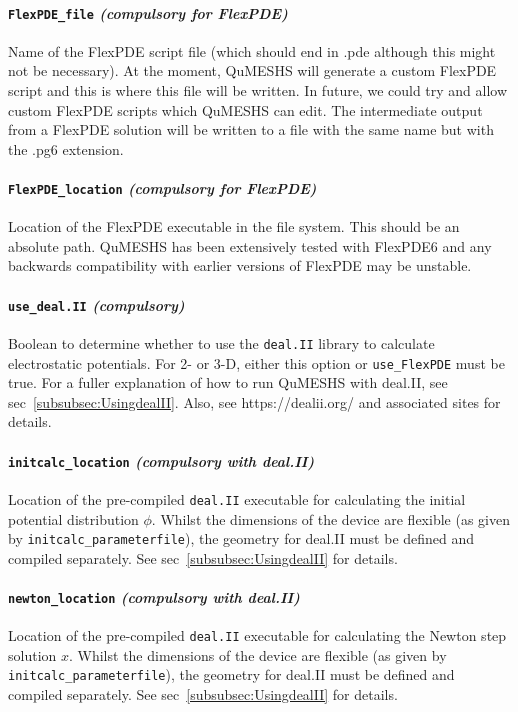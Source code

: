 \documentclass[12pt]{article}
\begin{document}
\paragraph{\texttt{FlexPDE\_file} \emph{(compulsory for FlexPDE)}}
Name of the FlexPDE script file (which should end in .pde although this might
not be necessary).  At the moment, QuMESHS will generate a custom FlexPDE
script and this is where this file will be written.  In future, we could try
and allow custom FlexPDE scripts which QuMESHS can edit.  The intermediate
output from a FlexPDE solution will be written to a file with the same name but
with the .pg6 extension.

\paragraph{\texttt{FlexPDE\_location} \emph{(compulsory for FlexPDE)}}
Location of the FlexPDE executable in the file system.  This should be an absolute
path.  QuMESHS has been extensively tested with FlexPDE6 and any backwards
compatibility with earlier versions of FlexPDE may be unstable.

\paragraph{\texttt{use\_deal.II} \emph{(compulsory)}}
Boolean to determine whether to use the \texttt{deal.II} library to calculate
electrostatic potentials.  For 2- or 3-D, either this option or
\texttt{use\_FlexPDE} must be true.  For a fuller explanation of how to
run QuMESHS with deal.II, see sec~\ref{subsubsec:UsingdealII}.  Also,
see https://dealii.org/ and associated sites for details.

\paragraph{\texttt{initcalc\_location} \emph{(compulsory with deal.II)}}
Location of the pre-compiled \texttt{deal.II} executable for calculating the initial
potential distribution $\phi$.  Whilst the dimensions of the device are flexible
(as given by \texttt{initcalc\_parameterfile}), the geometry for deal.II
must be defined and compiled separately.  See sec~\ref{subsubsec:UsingdealII}
for details.

\paragraph{\texttt{newton\_location} \emph{(compulsory with deal.II)}}
Location of the pre-compiled \texttt{deal.II} executable for calculating the Newton
step solution $x$.  Whilst the dimensions of the device are flexible
(as given by \texttt{initcalc\_parameterfile}), the geometry for deal.II
must be defined and compiled separately.  See sec~\ref{subsubsec:UsingdealII}
for details.
\end{document}
